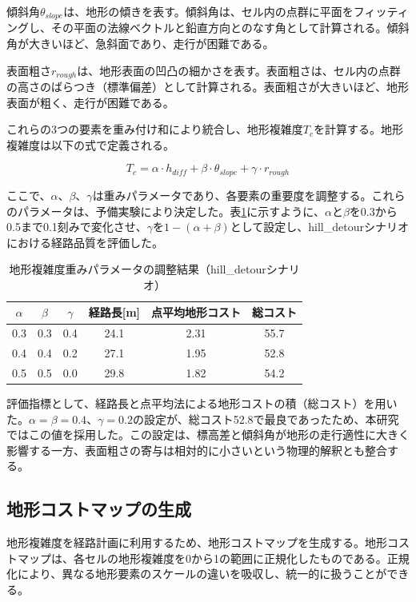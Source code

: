 傾斜角$\theta_{slope}$は、地形の傾きを表す。傾斜角は、セル内の点群に平面をフィッティングし、その平面の法線ベクトルと鉛直方向とのなす角として計算される。傾斜角が大きいほど、急斜面であり、走行が困難である。

表面粗さ$r_{rough}$は、地形表面の凹凸の細かさを表す。表面粗さは、セル内の点群の高さのばらつき（標準偏差）として計算される。表面粗さが大きいほど、地形表面が粗く、走行が困難である。

これらの3つの要素を重み付け和により統合し、地形複雑度$T_c$を計算する。地形複雑度は以下の式で定義される。

\begin{equation}
T_c = \alpha \cdot h_{diff} + \beta \cdot \theta_{slope} + \gamma \cdot r_{rough}
\label{eq:3_terrain_complexity}
\end{equation}

ここで、$\alpha$、$\beta$、$\gamma$は重みパラメータであり、各要素の重要度を調整する。これらのパラメータは、予備実験により決定した。表\ref{tab:terrain_weight_tuning}に示すように、$\alpha$と$\beta$を0.3から0.5まで0.1刻みで変化させ、$\gamma$を$1-(\alpha+\beta)$として設定し、hill\_detourシナリオにおける経路品質を評価した。

\begin{table}[htbp]
\centering
\caption{地形複雑度重みパラメータの調整結果（hill\_detourシナリオ）}
\label{tab:terrain_weight_tuning}
\begin{tabular}{ccc|ccc}
\hline
$\alpha$ & $\beta$ & $\gamma$ & 経路長[m] & 点平均地形コスト & 総コスト \\
\hline
0.3 & 0.3 & 0.4 & 24.1 & 2.31 & 55.7 \\
0.4 & 0.4 & 0.2 & 27.1 & 1.95 & 52.8 \\
0.5 & 0.5 & 0.0 & 29.8 & 1.82 & 54.2 \\
\hline
\end{tabular}
\end{table}

評価指標として、経路長と点平均法による地形コストの積（総コスト）を用いた。$\alpha=\beta=0.4$、$\gamma=0.2$の設定が、総コスト52.8で最良であったため、本研究ではこの値を採用した。この設定は、標高差と傾斜角が地形の走行適性に大きく影響する一方、表面粗さの寄与は相対的に小さいという物理的解釈とも整合する。

\subsection{地形コストマップの生成}

地形複雑度を経路計画に利用するため、地形コストマップを生成する。地形コストマップは、各セルの地形複雑度を0から1の範囲に正規化したものである。正規化により、異なる地形要素のスケールの違いを吸収し、統一的に扱うことができる。

